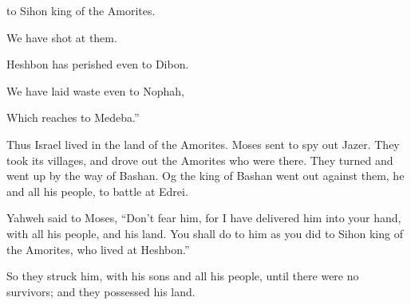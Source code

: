 {\par }{\QB to Sihon king of the Amorites.
\par }{\Q {}We have shot at them.
\par }{\QB Heshbon has perished even to Dibon.
\par }{\Q We have laid waste even to Nophah,
\par }{\QB Which reaches to Medeba.”
\par }{\PP {}Thus Israel lived in the land of the Amorites.
Moses sent to spy out Jazer. They took its villages, and drove out the Amorites who were there.
They turned and went up by the way of Bashan. Og the king of Bashan went out against them, he and all his people, to battle at Edrei.
\par }{\PP {}Yahweh said to Moses, “Don’t fear him, for I have delivered him into your hand, with all his people, and his land. You shall do to him as you did to Sihon king of the Amorites, who lived at Heshbon.”
\par }{\PP {}So they struck him, with his sons and all his people, until there were no survivors; and they possessed his land.

}

